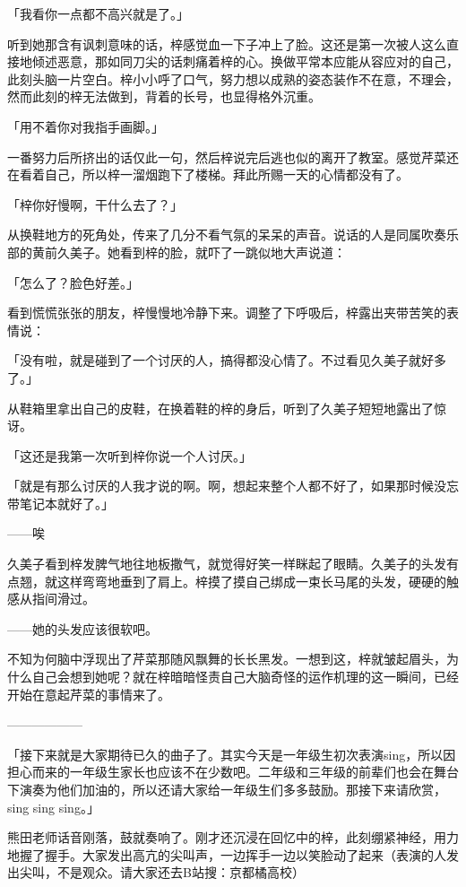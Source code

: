 \documentclass[UTF8]{ctexart}
\begin{document}
    「我看你一点都不高兴就是了。」

    听到她那含有讽刺意味的话，梓感觉血一下子冲上了脸。这还是第一次被人这么直接地倾述恶意，那如同刀尖的话刺痛着梓的心。换做平常本应能从容应对的自己，此刻头脑一片空白。梓小小呼了口气，努力想以成熟的姿态装作不在意，不理会，然而此刻的梓无法做到，背着的长号，也显得格外沉重。

    「用不着你对我指手画脚。」

    一番努力后所挤出的话仅此一句，然后梓说完后逃也似的离开了教室。感觉芹菜还在看着自己，所以梓一溜烟跑下了楼梯。拜此所赐一天的心情都没有了。

    「梓你好慢啊，干什么去了？」

    从换鞋地方的死角处，传来了几分不看气氛的呆呆的声音。说话的人是同属吹奏乐部的黄前久美子。她看到梓的脸，就吓了一跳似地大声说道：

    「怎么了？脸色好差。」

    看到慌慌张张的朋友，梓慢慢地冷静下来。调整了下呼吸后，梓露出夹带苦笑的表情说：

    「没有啦，就是碰到了一个讨厌的人，搞得都没心情了。不过看见久美子就好多了。」

    从鞋箱里拿出自己的皮鞋，在换着鞋的梓的身后，听到了久美子短短地露出了惊讶。

    「这还是我第一次听到梓你说一个人讨厌。」

    「就是有那么讨厌的人我才说的啊。啊，想起来整个人都不好了，如果那时候没忘带笔记本就好了。」

    ——唉

    久美子看到梓发脾气地往地板撒气，就觉得好笑一样眯起了眼睛。久美子的头发有点翘，就这样弯弯地垂到了肩上。梓摸了摸自己绑成一束长马尾的头发，硬硬的触感从指间滑过。

    ——她的头发应该很软吧。

    不知为何脑中浮现出了芹菜那随风飘舞的长长黑发。一想到这，梓就皱起眉头，为什么自己会想到她呢？就在梓暗暗怪责自己大脑奇怪的运作机理的这一瞬间，已经开始在意起芹菜的事情来了。

    ——————

    「接下来就是大家期待已久的曲子了。其实今天是一年级生初次表演sing，所以因担心而来的一年级生家长也应该不在少数吧。二年级和三年级的前辈们也会在舞台下演奏为他们加油的，所以还请大家给一年级生们多多鼓励。那接下来请欣赏，sing sing sing。」

    熊田老师话音刚落，鼓就奏响了。刚才还沉浸在回忆中的梓，此刻绷紧神经，用力地握了握手。大家发出高亢的尖叫声，一边挥手一边以笑脸动了起来（表演的人发出尖叫，不是观众。请大家还去B站搜：京都橘高校）
\end{document}
